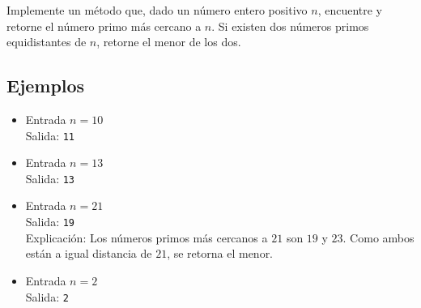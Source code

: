Implemente un método que, dado un número entero positivo \( n \), encuentre y retorne el número primo más cercano a \( n \). Si existen dos números primos equidistantes de \( n \), retorne el menor de los dos. 
\subsection*{Ejemplos}
\begin{itemize}
    \item Entrada \( n = 10 \)\\
    Salida: \texttt{11}

    \item Entrada \( n = 13 \)\\
    Salida: \texttt{13}

    \item Entrada \( n = 21 \)\\
    Salida: \texttt{19}\\
    Explicación:
    Los números primos más cercanos a \( 21 \) son \( 19 \) y \( 23 \). Como ambos están a igual distancia de \( 21 \), se retorna el menor.

    \item Entrada \( n = 2 \)\\
    Salida: \texttt{2}
\end{itemize}